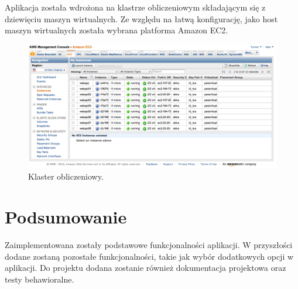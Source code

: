 \documentclass[wide,a4paper,titlepage,12pt]{article}
\begin{document}
Aplikacja została wdrożona na klastrze obliczeniowym składającym się z
dziewięciu maszyn wirtualnych. Ze względu na łatwą konfigurację, jako host
maszyn wirtualnych została wybrana platforma Amazon EC2.

\begin{figure}[h!]
\begin{center}
\includegraphics[scale=0.33]{ec2.png}
\end{center}
\caption{Klaster obliczeniowy.}
\label{fig:ec2}
\end{figure}

\section{Podsumowanie}

Zaimplementowana zostały podstawowe funkcjonalności aplikacji. W przyszłości
dodane zostaną pozostałe funkcjonalności, takie jak wybór dodatkowych opcji w
aplikacji. Do projektu dodana zostanie również dokumentacja projektowa oraz
testy behawioralne.
\end{document}
